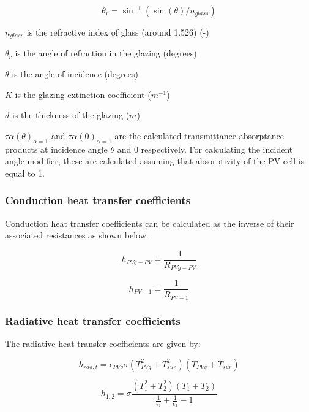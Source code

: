 \begin{equation}
\theta_{r}=\sin^{-1}\left(\sin(\theta)/n_{glass}\right)
\label{eq:BIPVT-theta-r}
\end{equation}

\(n_{glass}\) is the refractive index of glass (around 1.526) (-)

\(\theta_{r}\) is the angle of refraction in the glazing (degrees)

\(\theta\) is the angle of incidence (degrees)

\(K\) is the glazing extinction coefficient (\(m^{-1}\))

\(d\) is the thickness of the glazing (\(m\))

\(\tau\alpha(\theta)_{\alpha=1}\) and \(\tau\alpha(0)_{\alpha=1}\) are the calculated transmittance-absorptance products at incidence angle \(\theta\) and 0 respectively. For calculating the incident angle modifier, these are calculated assuming that absorptivity of the PV cell is equal to 1.

\subsubsection{Conduction heat transfer coefficients}\label{BIPVT-htc-c}

Conduction heat transfer coefficients can be calculated as the inverse of their associated resistances as shown below.

\begin{equation}
h_{PVg-PV}=\frac{1}{R_{PVg-PV}}
\label{eq:BIPVT-h-glass-cell}
\end{equation}

\begin{equation}
h_{PV-1}=\frac{1}{R_{PV-1}}
\label{eq:BIPVT-h-cell-1}
\end{equation}

\subsubsection{Radiative heat transfer coefficients}\label{BIPVT-htc-r}

The radiative heat transfer coefficients are given by:


\begin{equation}
h_{rad,t}=\epsilon_{PVg} \sigma \left(T^{2}_{PVg}+T^{2}_{sur} \right)\left(T_{PVg}+T_{sur}\right)
\label{eq:BIPVT-h-rad-t}
\end{equation}


\begin{equation}
h_{1,2}=\sigma \frac{\left(T^{2}_{1}+T^{2}_{2} \right)\left(T_{1}+T_{2}\right)}{\frac{1}{\epsilon_{1}}+\frac{1}{\epsilon_{2}}-1}
\label{eq:BIPVT-h-rad-1-2}
\end{equation}

